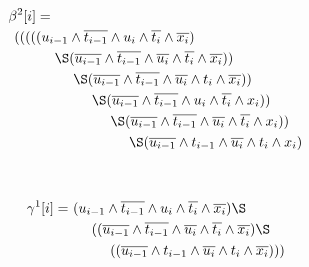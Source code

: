 \begin{small}
\begin{minipage}{.52\textwidth}
          \end{minipage}
          \hspace{-.12\textwidth}
          \begin{minipage}{.53\textwidth}
            \begin{equation*} \begin{split}
              \beta^2[i] &=\\ (((( &(u_{i-1}\wedge\overline{t_{i-1}}\wedge u_i \wedge\overline{t_i}\wedge \overline{x_i})
            \\
            & \ \ \ \ \S
            (\overline{u_{i-1}}\wedge\overline{t_{i-1}}\wedge\overline{u_i}\wedge\overline{t_i}\wedge \overline{x_i}))
            \\
            & \ \ \ \ \ \ \ \ \S
            (\overline{u_{i-1}}\wedge\overline{t_{i-1}}\wedge\overline{u_i}\wedge t_i\wedge \overline{x_i}))
            \\
            & \ \ \ \ \ \ \ \ \ \ \ \ \S
            (\overline{u_{i-1}}\wedge\overline{t_{i-1}}\wedge u_i\wedge\overline{t_i}\wedge x_i ))
            \\
            & \ \ \ \ \ \ \ \ \ \ \ \ \ \ \ \ \S
            (\overline{u_{i-1}}\wedge\overline{t_{i-1}}\wedge\overline{u_i}\wedge\overline{t_i}\wedge x_i))
            \\
            & \ \ \ \ \ \ \ \ \ \ \ \ \ \ \ \ \ \ \ \ \S
            (\overline{u_{i-1}}\wedge t_{i-1}\wedge\overline{u_i}\wedge t_i\wedge x_i)
            \end{split}\end{equation*}
          \end{minipage}
          ~\par\vspace{.3\baselineskip}
          \begin{minipage}{.48\textwidth}
            \begin{equation*} \begin{split}
              \gamma^1[i] = \ & (u_{i-1}\wedge\overline{t_{i-1}}\wedge u_i\wedge\overline{t_i}\wedge\overline{x_i})
            \S \\
            & \ \ \ \
            ((\overline{u_{i-1}}\wedge\overline{t_{i-1}}\wedge\overline{u_i}\wedge\overline{t_i}\wedge\overline{x_i})
            \S \\
            & \ \ \ \ \ \ \ \
            ((\overline{u_{i-1}}\wedge t_{i-1}\wedge\overline{u_i}\wedge t_i\wedge\overline{x_i})))
            \end{split}\end{equation*}

\end{minipage}
\end{small}

